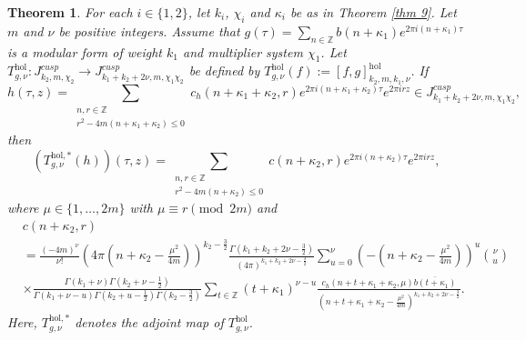 \documentclass[11pt]{amsart}
\newtheorem{thm}{Theorem}[section]
\theoremstyle{definition}
\theoremstyle{remark}
\numberwithin{equation}{section}
\renewcommand{\(}{\left(}
\renewcommand{\)}{\right)}
\def\ZZ{\mathbb{Z}}
\begin{document}
\begin{thm}\label{prop 2}
For each $i\in \{1,2\}$, let $k_i$, $\chi_i$ and $\kappa_i$ be as in Theorem \ref{thm 9}.
Let $m$ and $\nu$ be positive integers. 
Assume that $g(\tau)=\sum_{n\in \mathbb{Z}} b(n+\kappa_1)e^{2\pi i (n+\kappa_1)\tau}$ is a modular form of weight $k_1$ and multiplier system $\chi_1$. 
Let $T^{\mathrm{hol}}_{g,\nu}: J^{cusp}_{k_2,m,\chi_2}\to J^{cusp}_{k_1+k_2+2\nu,m,\chi_1\chi_2}$ be defined by $T^{\mathrm{hol}}_{g,\nu}(f):=[f,g]^{\mathrm{hol}}_{k_2,m,k_1,\nu}$. 
If 
\[h(\tau,z)=\sum_{\substack{n,r\in \ZZ \\ r^2-4m(n+\kappa_1+\kappa_2)\leq 0}} c_h(n+\kappa_1+\kappa_2,r)e^{2\pi i (n+\kappa_1+\kappa_2)\tau}e^{2\pi i r z}\in J^{cusp}_{k_1+k_2+2\nu,m,\chi_1\chi_2},\]
then   
\[ \left(T^{\mathrm{hol},*}_{g,\nu}(h)\right)(\tau,z)=\sum_{\substack{n,r\in \ZZ\\ r^2-4m(n+\kappa_2)\leq 0}} c(n+\kappa_2,r)e^{2\pi i (n+\kappa_2)\tau}e^{2\pi i r z},\]
where $\mu\in\{1,\dots,2m\}$ with $\mu\equiv r\pmod{2m}$ and
\begin{equation*}
        \begin{aligned}
            &c(n+\kappa_2,r)\\
            &=\frac{(-4m)^{\nu}}{\nu!}(4\pi(n+\kappa_{2}-\frac{\mu^2}{4m}))^{k_2-\frac{3}{2}}\frac{\Gamma(k_1+k_2+2\nu-\frac{3}{2})}{(4\pi)^{k_1+k_2+2\nu-\frac{3}{2}}}\sum_{u=0}^{\nu} (-(n+\kappa_{2}-\frac{\mu^2}{4m}))^{u}\binom{\nu}{u}\\
            &\times\frac{\Gamma(k_1+\nu)\Gamma(k_2+\nu-\frac{1}{2})}{\Gamma(k_1+\nu-u)\Gamma(k_2+u-\frac{1}{2})\Gamma(k_2-\frac{3}{2})}\sum_{t\in \mathbb{Z}} (t+\kappa_{1})^{\nu-u}\frac{c_h(n+t+\kappa_{1}+\kappa_{2},\mu)\overline{b(t+\kappa_{1})}}{(n+t+\kappa_{1}+\kappa_{2}-\frac{\mu^2}{4m})^{k_1+k_2+2\nu-\frac{3}{2}}}.
        \end{aligned}
    \end{equation*}
Here, $T^{\mathrm{hol},*}_{g,\nu}$ denotes the adjoint map of $T^{\mathrm{hol}}_{g,\nu}$.
\end{thm}
\end{document}
